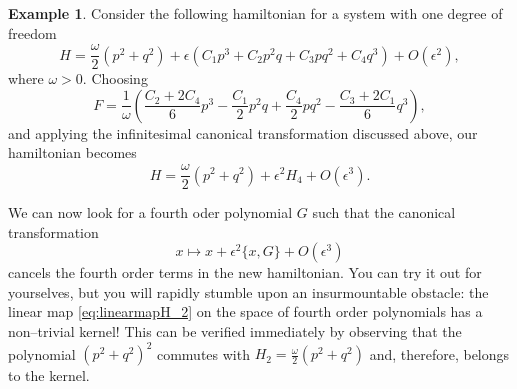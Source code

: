 \documentclass[english,fontsize=11pt,paper=b5]{scrbook}
\theoremstyle{definition}
\newtheorem{example}{Example}[chapter]
\begin{document}
      \begin{example}
        Consider the following hamiltonian for a system with one degree of freedom
        \begin{equation}
          H = \frac\omega2 (p^2 + q^2) + \epsilon(C_1 p^3 + C_2 p^2 q + C_3 p q^2 + C_4 q^3) + O(\epsilon^2),
        \end{equation}
        where $\omega >0$.
        Choosing
        \begin{equation}
          F = \frac{1}{\omega}\left(
            \frac{C_2 + 2 C_4}{6} p^3
            - \frac {C_1}2 p^2 q
            + \frac{C_4}{2} p q^2
            -\frac{C_3 + 2 C_1}{6} q^3
          \right),
        \end{equation}
        and applying the infinitesimal canonical transformation discussed above, our hamiltonian becomes
        \begin{equation}
          H = \frac{\omega}{2}(p^2 + q^2) + \epsilon^2 H_4 + O(\epsilon^3).
        \end{equation}

        We can now look for a fourth oder polynomial $G$ such that the canonical transformation
        \begin{equation}
          x \mapsto x + \epsilon^2 \big\{x, G\big\} + O(\epsilon^3)
        \end{equation}
        cancels the fourth order terms in the new hamiltonian.
        You can try it out for yourselves, but you will rapidly stumble upon an insurmountable obstacle: the linear map \eqref{eq:linearmapH_2} on the space of fourth order polynomials has a non--trivial kernel! This can be verified immediately by observing that the polynomial $(p^2+q^2)^2$ commutes with $H_2=\frac\omega2(p^2+q^2)$ and, therefore, belongs to the kernel.
      \end{example}
\end{document}
